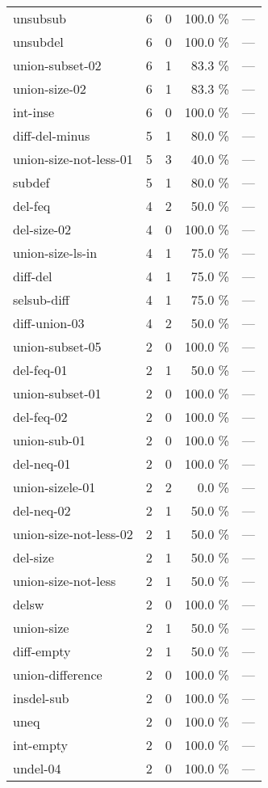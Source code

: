 \documentclass[a4paper]{article}
\begin{document}
\begin{supertabular}{l|r|r|r|r}
unsubsub & 6 & 0 & 100.0 \% & ---\\
unsubdel & 6 & 0 & 100.0 \% & ---\\
union-subset-02 & 6 & 1 & 83.3 \% & ---\\
union-size-02 & 6 & 1 & 83.3 \% & ---\\
int-inse & 6 & 0 & 100.0 \% & ---\\
diff-del-minus & 5 & 1 & 80.0 \% & ---\\
union-size-not-less-01 & 5 & 3 & 40.0 \% & ---\\
subdef & 5 & 1 & 80.0 \% & ---\\
del-feq & 4 & 2 & 50.0 \% & ---\\
del-size-02 & 4 & 0 & 100.0 \% & ---\\
union-size-ls-in & 4 & 1 & 75.0 \% & ---\\
diff-del & 4 & 1 & 75.0 \% & ---\\
selsub-diff & 4 & 1 & 75.0 \% & ---\\
diff-union-03 & 4 & 2 & 50.0 \% & ---\\
union-subset-05 & 2 & 0 & 100.0 \% & ---\\
del-feq-01 & 2 & 1 & 50.0 \% & ---\\
union-subset-01 & 2 & 0 & 100.0 \% & ---\\
del-feq-02 & 2 & 0 & 100.0 \% & ---\\
union-sub-01 & 2 & 0 & 100.0 \% & ---\\
del-neq-01 & 2 & 0 & 100.0 \% & ---\\
union-sizele-01 & 2 & 2 & 0.0 \% & ---\\
del-neq-02 & 2 & 1 & 50.0 \% & ---\\
union-size-not-less-02 & 2 & 1 & 50.0 \% & ---\\
del-size & 2 & 1 & 50.0 \% & ---\\
union-size-not-less & 2 & 1 & 50.0 \% & ---\\
delsw & 2 & 0 & 100.0 \% & ---\\
union-size & 2 & 1 & 50.0 \% & ---\\
diff-empty & 2 & 1 & 50.0 \% & ---\\
union-difference & 2 & 0 & 100.0 \% & ---\\
insdel-sub & 2 & 0 & 100.0 \% & ---\\
uneq & 2 & 0 & 100.0 \% & ---\\
int-empty & 2 & 0 & 100.0 \% & ---\\
undel-04 & 2 & 0 & 100.0 \% & ---\\

\end{supertabular}
\end{document}
